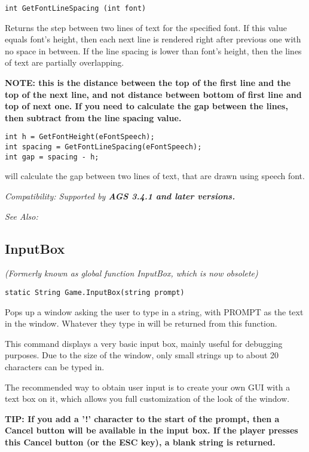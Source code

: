 \begin{verbatim}
int GetFontLineSpacing (int font)
\end{verbatim}
Returns the step between two lines of text for the specified font. If this value equals font's height, then each next line is rendered right after previous one with no space in between. If the line spacing is lower than font's height, then the lines of text are partially overlapping.

\bf{NOTE:} this is the distance between the \bf{top} of the first line and the \bf{top} of the next line, and \bf{not} distance between bottom of first line and top of next one. If you need to calculate the \bf{gap} between the lines, then subtract  from the line spacing value.

\begin{verbatim}
int h = GetFontHeight(eFontSpeech);
int spacing = GetFontLineSpacing(eFontSpeech);
int gap = spacing - h;
\end{verbatim}
will calculate the gap between two lines of text, that are drawn using speech font.

\it{Compatibility:} Supported by \bf{AGS 3.4.1} and later versions.

\it{See Also:} 



\subsection{InputBox}\label{Game.InputBox}%

\it{(Formerly known as global function InputBox, which is now obsolete)}

\begin{verbatim}
static String Game.InputBox(string prompt)
\end{verbatim}
Pops up a window asking the user to type in a string, with PROMPT as the
text in the window. Whatever they type in will be returned from this function.

This command displays a very basic input box, mainly useful for debugging
purposes. Due to the size of the window, only small strings up to about 20
characters can be typed in.

The recommended way to obtain user input is to create your own GUI with a text
box on it, which allows you full customization of the look of the window.

\bf{TIP:} If you add a '!' character to the start of the prompt, then a Cancel button will be
available in the input box. If the player presses this Cancel button (or the ESC key),
a blank string is returned.


